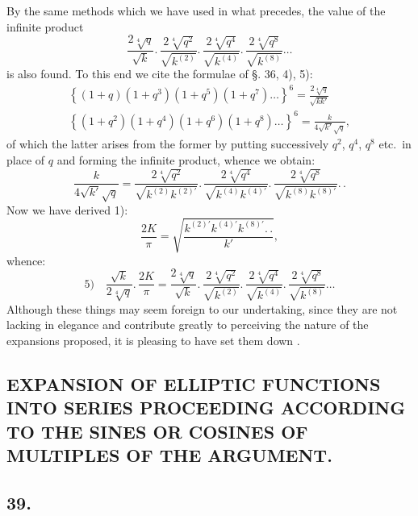 \documentclass{article}
\begin{document}
By the same methods which we have used in what precedes, the value of the infinite product
\[
\frac{2\sqrt[4]{q}}{\sqrt{k}}.\,\frac{2\sqrt[4]{q^{2}}}{\sqrt{k^{(2)}}}.\,\frac{2\sqrt[4]{q^{4}}}{\sqrt{k^{(4)}}}.\,\frac{2\sqrt[4]{q^{8}}}{\sqrt{k^{(8)}}}\ldots
\]
is also found. To this end we cite the formulae of §. 36, 4), 5):
\[
\begin{gathered}
\left\{(1+q)(1+q^{3})(1+q^{5})(1+q^{7})\ldots\right\}^{6}=\frac{2\sqrt[4]{q}}{\sqrt{kk'}}\\[1.5ex]
\left\{(1+q^{2})(1+q^{4})(1+q^{6})(1+q^{8})\ldots\right\}^{6}=\frac{k}{4\sqrt{k'}\sqrt{q}},
\end{gathered}
\]
of which the latter arises from the former by putting successively $q^{2}$, $q^{4}$, $q^{8}$ etc.\ in place of $q$ and forming the infinite product, whence we obtain:
\[
\frac{k}{4\sqrt{k'}\sqrt{q}}=\frac{2\sqrt[4]{q^{2}}}{\sqrt{k^{(2)}k^{(2)\prime}}}.\,\frac{2\sqrt[4]{q^{4}}}{\sqrt{k^{(4)}k^{(4)\prime}}}.\,\frac{2\sqrt[4]{q^{8}}}{\sqrt{k^{(8)}k^{(8)\prime}}}.\,.
\]
Now we have derived 1):
\[
\frac{2K}{\pi}=\sqrt{\frac{k^{(2)\prime}k^{(4)\prime}k^{(8)\prime}.\,.}{k'}},
\]
whence:
\[
\text{5)}\quad\frac{\sqrt{k}}{2\sqrt[4]{q}}.\,\frac{2K}{\pi}=\frac{2\sqrt[4]{q}}{\sqrt{k}}.\,\frac{2\sqrt[4]{q^{2}}}{\sqrt{k^{(2)}}}.\,\frac{2\sqrt[4]{q^{4}}}{\sqrt{k^{(4)}}}.\,\frac{2\sqrt[4]{q^{8}}}{\sqrt{k^{(8)}}}\ldots
\]
Although these things may seem foreign to our undertaking, since they are not lacking in elegance and contribute greatly to perceiving the nature of the expansions proposed, it is pleasing to have set them down .

\subsection*{EXPANSION OF ELLIPTIC FUNCTIONS INTO SERIES PROCEEDING ACCORDING TO THE SINES OR COSINES OF MULTIPLES OF THE ARGUMENT.}

\subsection*{39.}
\end{document}
